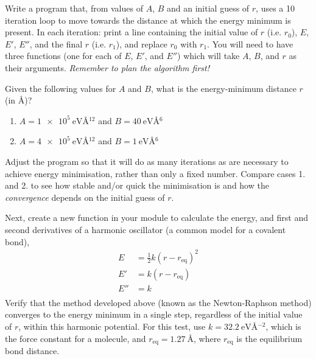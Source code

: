 \documentclass[a4paper]{article}
\begin{document}
Write a program that, from values of $A$, $B$ and an initial guess of $r$, uses a 10 iteration loop to move towards the distance at which the energy minimum is present.
In each iteration: print a line containing the initial value of $r$ (i.e. $r_0$), $E$, $E'$, $E''$, and the final $r$ (i.e. $r_1$), and replace $r_0$ with $r_1$.
You will need to have three functions (one for each of $E$, $E'$, and $E''$) which will take $A$, $B$, and $r$ as their arguments.
\emph{Remember to plan the algorithm first!}

Given the following values for $A$ and $B$, what is the energy-minimum distance $r$ (in \AA)?
\begin{enumerate}
  \item{$A = \SI{1e5}{\eV\angstrom^{12}}$ and $B = \SI{40}{\eV\angstrom^{6}}$}
  \item{$A = \SI{4e5}{\eV\angstrom^{12}}$ and $B = \SI{1}{\eV\angstrom^{6}}$}
\end{enumerate}
Adjust the program so that it will do as many iterations as are necessary to achieve energy minimisation, rather than only a fixed number.
Compare cases 1. and 2. to see how stable and/or quick the minimisation is and how the \emph{convergence} depends on the initial guess of $r$.

Next, create a new function in your module to calculate the energy, and first and second derivatives of a harmonic oscillator (a common model for a covalent bond),
\begin{equation}
  \begin{aligned}
    E & = \frac{1}{2}k(r-r_{\text{eq}})^2 \\
    E' & = k(r-r_{\text{eq}}) \\
    E'' & = k \\
  \end{aligned}
\end{equation}
Verify that the method developed above (known as the Newton-Raphson method) converges to the energy minimum in a single step, regardless of the initial value of $r$, within this harmonic potential.
For this test, use $k = \SI{32.2}{\eV\angstrom^{-2}}$, which is the force constant for a  molecule, and $r_{\text{eq}}=\SI{1.27}{\angstrom}$, where $r_{\text{eq}}$ is the equilibrium bond distance.


%
%
\end{document}

